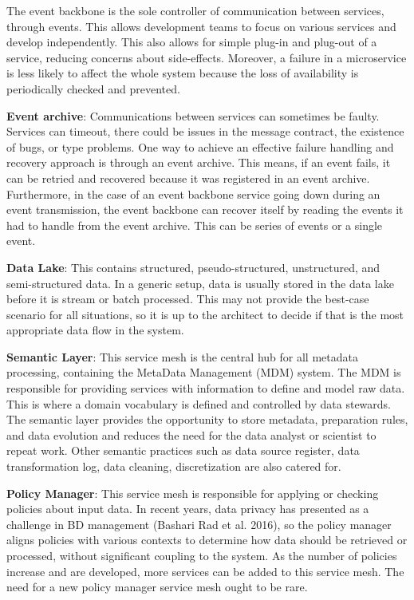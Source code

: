 \documentclass[runningheads]{llncs}
\begin{document}
The event backbone is the sole controller of communication between services, through events. This allows development teams to focus on various services and develop independently. This also allows for simple plug-in and plug-out of a service, reducing concerns about side-effects. Moreover, a failure in a microservice is less likely to affect the whole system because the loss of availability is periodically checked and prevented.

\textbf{Event archive}: Communications between services can sometimes be faulty. Services can timeout, there could be issues in the message contract, the existence of bugs, or type problems. One way to achieve an effective failure handling and recovery approach is through an event archive. This means, if an event fails, it can be retried and recovered because it was registered in an event archive. Furthermore, in the case of an event backbone service going down during an event transmission, the event backbone can recover itself by reading the events it had to handle from the event archive. This can be series of events or a single event.

\textbf{Data Lake}: This contains structured, pseudo-structured, unstructured, and semi-structured data. In a generic setup, data is usually stored in the data lake before it is stream or batch processed. This may not provide the best-case scenario for all situations, so it is up to the architect to decide if that is the most appropriate  data flow in the system.

\textbf{Semantic Layer}: This service mesh is the central hub for all metadata processing, containing the MetaData Management (MDM) system. The MDM is responsible for providing services with information to define and model raw data. This is where a domain vocabulary is defined and controlled by data stewards. The semantic layer provides the opportunity to store metadata, preparation rules, and data evolution and reduces the need for the data analyst or scientist to repeat work. Other semantic practices such as data source register, data transformation log, data cleaning, discretization are also catered for.

\textbf{Policy Manager}: This service mesh is responsible for applying or checking policies about input data. In recent years, data privacy has presented as a challenge in BD management (Bashari Rad et al. 2016), so the policy manager aligns policies with various contexts to determine how data should be retrieved or processed, without significant coupling to the system. As the number of policies increase and are developed, more services can be added to this service mesh. The need for a new policy manager service mesh ought to be rare.
\end{document}
